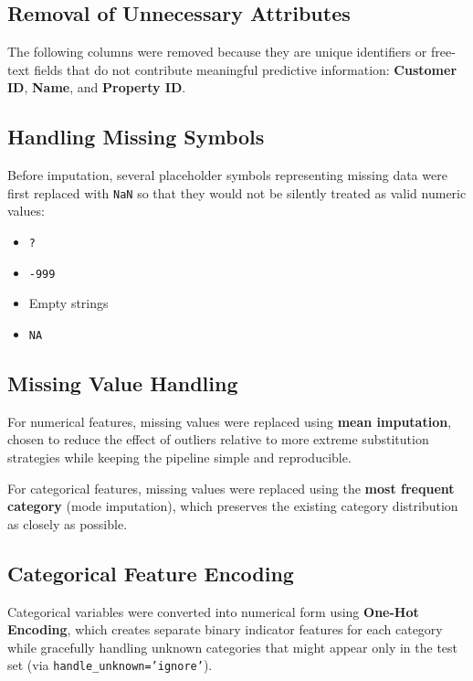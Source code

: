 \documentclass[12pt,a4paper]{article}
\begin{document}
\subsection{Removal of Unnecessary Attributes}

The following columns were removed because they are unique identifiers or free-text fields that do not contribute meaningful predictive information: \textbf{Customer ID}, \textbf{Name}, and \textbf{Property ID}.

\subsection{Handling Missing Symbols}

Before imputation, several placeholder symbols representing missing data were first replaced with \texttt{NaN} so that they would not be silently treated as valid numeric values:

\begin{itemize}
\item \texttt{?}
\item \texttt{-999}
\item Empty strings
\item \texttt{NA}
\end{itemize}

\subsection{Missing Value Handling}

For numerical features, missing values were replaced using \textbf{mean imputation}, chosen to reduce the effect of outliers relative to more extreme substitution strategies while keeping the pipeline simple and reproducible.

For categorical features, missing values were replaced using the \textbf{most frequent category} (mode imputation), which preserves the existing category distribution as closely as possible.

\subsection{Categorical Feature Encoding}

Categorical variables were converted into numerical form using \textbf{One-Hot Encoding}, which creates separate binary indicator features for each category while gracefully handling unknown categories that might appear only in the test set (via \texttt{handle\_unknown='ignore'}).
\end{document}
